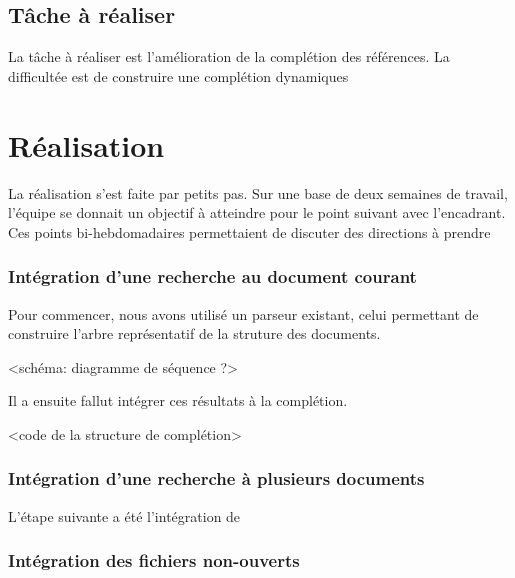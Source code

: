 \documentclass[a4paper,11pt]{report}
\begin{document}
\section{Tâche à réaliser} %
\label{sec:tache_a_realiser}
La tâche à réaliser est l'amélioration de la complétion des références. La difficultée est de construire une complétion dynamiques


\chapter{Réalisation}
La réalisation s'est faite par petits pas. Sur une base de deux semaines de travail, l'équipe se donnait un objectif à atteindre pour le point suivant avec l'encadrant.
Ces points bi-hebdomadaires permettaient de discuter des directions à prendre 

\subsection{Intégration d'une recherche au document courant}
Pour commencer, nous avons utilisé un parseur existant, celui permettant de construire l'arbre représentatif de la struture des documents.

<schéma: diagramme de séquence ?>

Il a ensuite fallut intégrer ces résultats à la complétion.

<code de la structure de complétion> 

\subsection{Intégration d'une recherche à plusieurs documents}

L'étape suivante a été l'intégration de 

\subsection{Intégration des fichiers non-ouverts}
\end{document}

